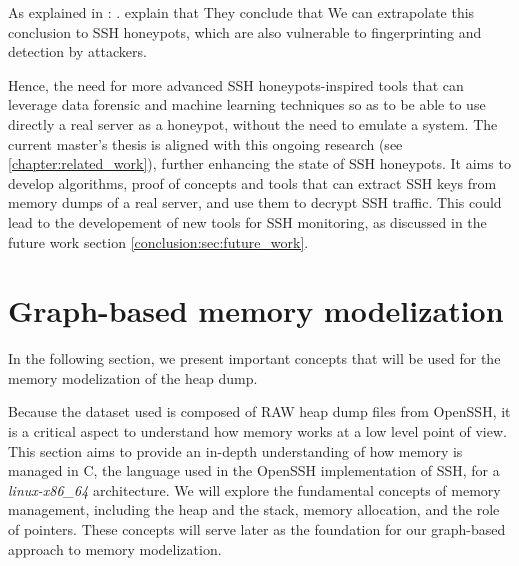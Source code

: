     As explained in : . \citeauthor{SSHHoneypotEffectiveness23} explain that  They conclude that  We can extrapolate this conclusion to SSH honeypots, which are also vulnerable to fingerprinting and detection by attackers. 
    
    Hence, the need for more advanced SSH honeypots-inspired tools that can leverage data forensic and machine learning techniques so as to be able to use directly a real server as a honeypot, without the need to emulate a system. The current master's thesis is aligned with this ongoing research (see \ref{chapter:related_work}), further enhancing the state of SSH honeypots. It aims to develop algorithms, proof of concepts and tools that can extract SSH keys from memory dumps of a real server, and use them to decrypt SSH traffic. This could lead to the developement of new tools for SSH monitoring, as discussed in the future work section \ref{conclusion:sec:future_work}.

\section{Graph-based memory modelization}\label{sec:background:graph}

    In the following section, we present important concepts that will be used for the memory modelization of the heap dump.

    Because the dataset used is composed of RAW heap dump files from OpenSSH, it is a critical aspect to understand how memory works at a low level point of view. This section aims to provide an in-depth understanding of how memory is managed in C, the language used in the OpenSSH implementation of SSH, for a \textit{linux-x86\_64} architecture. We will explore the fundamental concepts of memory management, including the heap and the stack, memory allocation, and the role of pointers. These concepts will serve later as the foundation for our graph-based approach to memory modelization.

